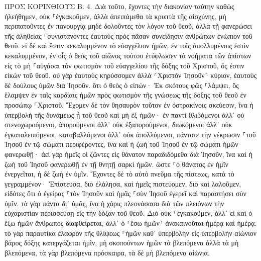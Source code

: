 \documentclass[twoside, 9pt]{extreport}
\begin{document}
ΠΡΟΣ ΚΟΡΙΝΘΙΟΥΣ Β.
4.
Διὰ τοῦτο, ἔχοντες τὴν διακονίαν ταύτην καθὼς ἠλεήθημεν, οὐκ ⸀ἐγκακοῦμεν, 
ἀλλὰ ἀπειπάμεθα τὰ κρυπτὰ τῆς αἰσχύνης, μὴ περιπατοῦντες ἐν πανουργίᾳ μηδὲ δολοῦντες τὸν λόγον τοῦ θεοῦ, ἀλλὰ τῇ φανερώσει τῆς ἀληθείας ⸀συνιστάνοντες ἑαυτοὺς πρὸς πᾶσαν συνείδησιν ἀνθρώπων ἐνώπιον τοῦ θεοῦ. 
εἰ δὲ καὶ ἔστιν κεκαλυμμένον τὸ εὐαγγέλιον ἡμῶν, ἐν τοῖς ἀπολλυμένοις ἐστὶν κεκαλυμμένον, 
ἐν οἷς ὁ θεὸς τοῦ αἰῶνος τούτου ἐτύφλωσεν τὰ νοήματα τῶν ἀπίστων εἰς τὸ μὴ ⸀αὐγάσαι τὸν φωτισμὸν τοῦ εὐαγγελίου τῆς δόξης τοῦ Χριστοῦ, ὅς ἐστιν εἰκὼν τοῦ θεοῦ. 
οὐ γὰρ ἑαυτοὺς κηρύσσομεν ἀλλὰ ⸂Χριστὸν Ἰησοῦν⸃ κύριον, ἑαυτοὺς δὲ δούλους ὑμῶν διὰ Ἰησοῦν. 
ὅτι ὁ θεὸς ὁ εἰπών· Ἐκ σκότους φῶς ⸀λάμψει, ὃς ἔλαμψεν ἐν ταῖς καρδίαις ἡμῶν πρὸς φωτισμὸν τῆς γνώσεως τῆς δόξης τοῦ θεοῦ ἐν προσώπῳ ⸀Χριστοῦ. 
Ἔχομεν δὲ τὸν θησαυρὸν τοῦτον ἐν ὀστρακίνοις σκεύεσιν, ἵνα ἡ ὑπερβολὴ τῆς δυνάμεως ᾖ τοῦ θεοῦ καὶ μὴ ἐξ ἡμῶν· 
ἐν παντὶ θλιβόμενοι ἀλλ᾽ οὐ στενοχωρούμενοι, ἀπορούμενοι ἀλλ᾽ οὐκ ἐξαπορούμενοι, 
διωκόμενοι ἀλλ᾽ οὐκ ἐγκαταλειπόμενοι, καταβαλλόμενοι ἀλλ᾽ οὐκ ἀπολλύμενοι, 
πάντοτε τὴν νέκρωσιν ⸀τοῦ Ἰησοῦ ἐν τῷ σώματι περιφέροντες, ἵνα καὶ ἡ ζωὴ τοῦ Ἰησοῦ ἐν τῷ σώματι ἡμῶν φανερωθῇ· 
ἀεὶ γὰρ ἡμεῖς οἱ ζῶντες εἰς θάνατον παραδιδόμεθα διὰ Ἰησοῦν, ἵνα καὶ ἡ ζωὴ τοῦ Ἰησοῦ φανερωθῇ ἐν τῇ θνητῇ σαρκὶ ἡμῶν. 
ὥστε ⸀ὁ θάνατος ἐν ἡμῖν ἐνεργεῖται, ἡ δὲ ζωὴ ἐν ὑμῖν. 
Ἔχοντες δὲ τὸ αὐτὸ πνεῦμα τῆς πίστεως, κατὰ τὸ γεγραμμένον· Ἐπίστευσα, διὸ ἐλάλησα, καὶ ἡμεῖς πιστεύομεν, διὸ καὶ λαλοῦμεν, 
εἰδότες ὅτι ὁ ἐγείρας ⸀τὸν Ἰησοῦν καὶ ἡμᾶς ⸀σὺν Ἰησοῦ ἐγερεῖ καὶ παραστήσει σὺν ὑμῖν. 
τὰ γὰρ πάντα δι᾽ ὑμᾶς, ἵνα ἡ χάρις πλεονάσασα διὰ τῶν πλειόνων τὴν εὐχαριστίαν περισσεύσῃ εἰς τὴν δόξαν τοῦ θεοῦ. 
Διὸ οὐκ ⸀ἐγκακοῦμεν, ἀλλ᾽ εἰ καὶ ὁ ἔξω ἡμῶν ἄνθρωπος διαφθείρεται, ἀλλ᾽ ὁ ⸂ἔσω ἡμῶν⸃ ἀνακαινοῦται ἡμέρᾳ καὶ ἡμέρᾳ. 
τὸ γὰρ παραυτίκα ἐλαφρὸν τῆς θλίψεως ⸀ἡμῶν καθ᾽ ὑπερβολὴν εἰς ὑπερβολὴν αἰώνιον βάρος δόξης κατεργάζεται ἡμῖν, 
μὴ σκοπούντων ἡμῶν τὰ βλεπόμενα ἀλλὰ τὰ μὴ βλεπόμενα, τὰ γὰρ βλεπόμενα πρόσκαιρα, τὰ δὲ μὴ βλεπόμενα αἰώνια. 
\end{document}
